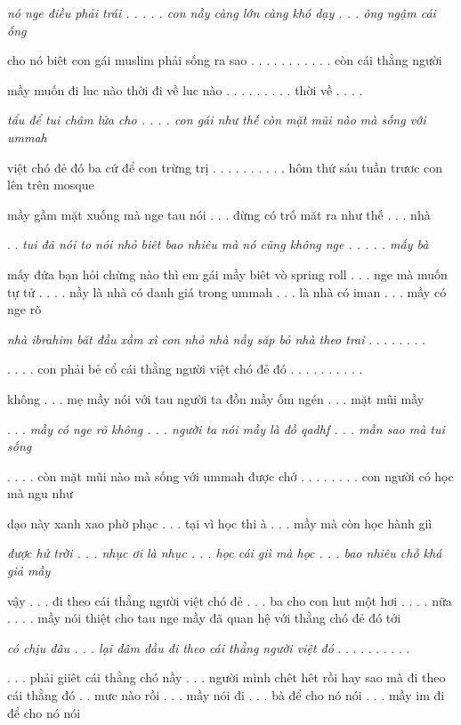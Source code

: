 \documentclass[../main.tex]{subfiles}
\begin{document}
\begin{multicols}{2}
\begin{blockquote}
\textit{nó nge điều phải trái . . . . . con nầy càng lớn càng khó dạy . . . ông ngậm cái ống}  
 
cho nó biêt con gái muslim phải sống ra sao . . . . . . . . . . . còn cái thằng người  
 
mầy muốn đi luc nào thời đi về luc nào . . . . . . . . . thời về . . . .  
 
\textit{tẩu để tui châm lửa cho . . . . con gái như thế còn mặt mũi nào mà sống với ummah}  
 
việt chó đẻ đó ba cứ để con trừng trị . . . . . . . . . . hôm thứ sáu tuần trươc con lên trên mosque  
 
mầy gầm mặt xuống mà nge tau nói . . . đừng có trố măt ra như thế . . . nhà  
 
. . \textit{tui đã nói to nói nhỏ biêt bao nhiêu mà nó cũng không nge . . . . . mấy bà } 
 
mấy đứa bạn hỏi chừng nào thì em gái mầy biêt vò spring roll . . . nge mà muốn tự tử . . . .  
nầy là nhà có danh giá trong ummah . . . là nhà có iman . . . mầy có nge rõ  
 
\textit{nhà ibrahim băt đầu xầm xì con nhỏ nhà nầy săp bỏ nhà theo trai} . . . . . . . .  
 
. . . . con phải bẻ cổ cái thằng người việt chó đẻ đó . . . . . . . . . .  
 
không . . . mẹ mầy nói với tau người ta đồn mầy ốm ngén . . . mặt mũi mầy  
 
. . .\textit{ mầy có nge rõ không . . . người ta nói mầy là đồ qadhf . . . mần sao mà tui sống}  
 
. . . . còn mặt mũi nào mà sống với ummah được chớ . . . . . . . . con người có học mà ngu như  
 
dạo này xanh xao phờ phạc . . . tại vì học thi à . . . mầy mà còn học hành giì  
 
\textit{được hử trời . . . nhục ơi là nhục . . . học cái giì mà học . . . bao nhiêu chỗ khá giả mầy}  
 
vậy . . . đi theo cái thằng người việt chó đẻ . . . ba cho con hut một hơi . . . .  
nữa . . . . mầy nói thiệt cho tau nge mầy đã quan hệ với thằng chó đẻ đó tới  
 
\textit{có chịu đâu . . . lại đâm đầu đi theo cái thằng người việt đó} . . . . . . . . . .  
 
. . . phải giiêt cái thằng chó nầy . . . người mình chêt hêt rồi hay sao mà đi theo cái thằng đó . .  
mưc nào rồi . . . mầy nói đi . . . bà để cho nó nói . . . mầy im đi để cho nó nói  
 

\end{blockquote}
\end{multicols}
\end{document}
